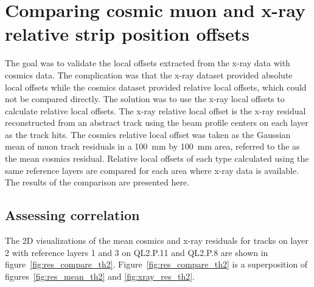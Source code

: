 
\chapter{Comparing cosmic muon and x-ray relative strip position offsets}
\label{chap:comparison}

The goal was to validate the local offsets extracted from the x-ray data with cosmics data. The complication was that the x-ray dataset provided absolute local offsets while the cosmics dataset provided relative local offsets, which could not be compared directly. The solution was to use the x-ray local offsets to calculate relative local offsets. The x-ray relative local offset is the x-ray residual reconstructed from an abstract track using the beam profile centers on each layer as the track hits. The cosmics relative local offset was taken as the Gaussian mean of muon track residuals in a \SI{100}{mm} by \SI{100}{mm} area, referred to the as the mean cosmics residual. Relative local offsets of each type calculated using the same reference layers are compared for each area where x-ray data is available. The  results of the comparison are presented here.



\section{Assessing correlation}
\label{sec:assessing_correlation}

The 2D visualizations of the mean cosmics and x-ray residuals for tracks on layer 2 with reference layers 1 and 3 on QL2.P.11 and QL2.P.8 are shown in figure~\ref{fig:res_compare_th2}. Figure~\ref{fig:res_compare_th2} is a superposition of figures~\ref{fig:res_mean_th2} and \ref{fig:xray_res_th2}.

